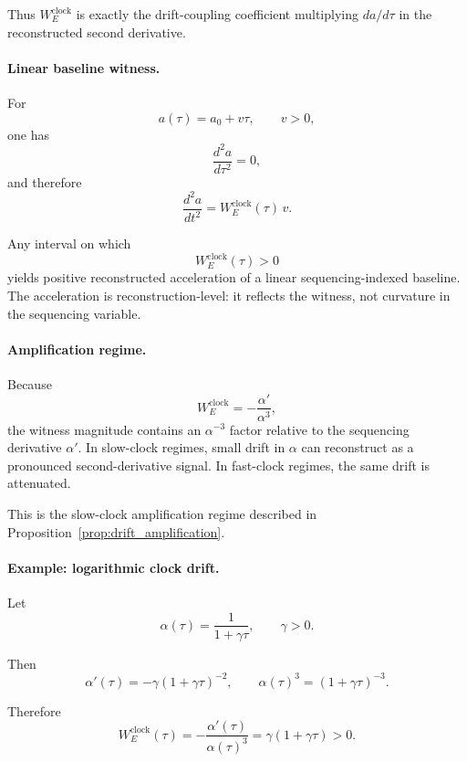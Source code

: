 \documentclass[aps,prx,onecolumn,11pt]{revtex4-2}
\theoremstyle{plain}
\theoremstyle{definition}
\theoremstyle{remark}
\begin{document}
Thus \(W^{\mathrm{clock}}_E\) is exactly the drift-coupling coefficient
multiplying \(da/d\tau\) in the reconstructed second derivative.

\paragraph{Linear baseline witness.}

For
\[
a(\tau)=a_0+v\tau,
\qquad
v>0,
\]
one has
\[
\frac{d^2a}{d\tau^2}=0,
\]
and therefore
\begin{equation}
\frac{d^2a}{dt^2}
=
W^{\mathrm{clock}}_E(\tau)\,v.
\label{eq:clock_drift_linear_baseline}
\end{equation}

Any interval on which
\[
W^{\mathrm{clock}}_E(\tau)>0
\]
yields positive reconstructed acceleration of a linear
sequencing-indexed baseline. The acceleration is reconstruction-level:
it reflects the witness, not curvature in the sequencing variable.

\paragraph{Amplification regime.}

Because
\[
W^{\mathrm{clock}}_E
=
-\frac{\alpha'}{\alpha^3},
\]
the witness magnitude contains an \(\alpha^{-3}\) factor relative to
the sequencing derivative \(\alpha'\). In slow-clock regimes, small
drift in \(\alpha\) can reconstruct as a pronounced second-derivative
signal. In fast-clock regimes, the same drift is attenuated.

This is the slow-clock amplification regime described in
Proposition~\ref{prop:drift_amplification}.

\paragraph{Example: logarithmic clock drift.}

Let
\begin{equation}
\alpha(\tau)
=
\frac{1}{1+\gamma\tau},
\qquad
\gamma>0.
\label{eq:clock_drift_log_alpha}
\end{equation}

Then
\[
\alpha'(\tau)
=
-\gamma(1+\gamma\tau)^{-2},
\qquad
\alpha(\tau)^3
=
(1+\gamma\tau)^{-3}.
\]

Therefore
\begin{equation}
W^{\mathrm{clock}}_E(\tau)
=
-\frac{\alpha'(\tau)}{\alpha(\tau)^3}
=
\gamma(1+\gamma\tau)
>
0.
\label{eq:clock_drift_log_witness}
\end{equation}
\end{document}
